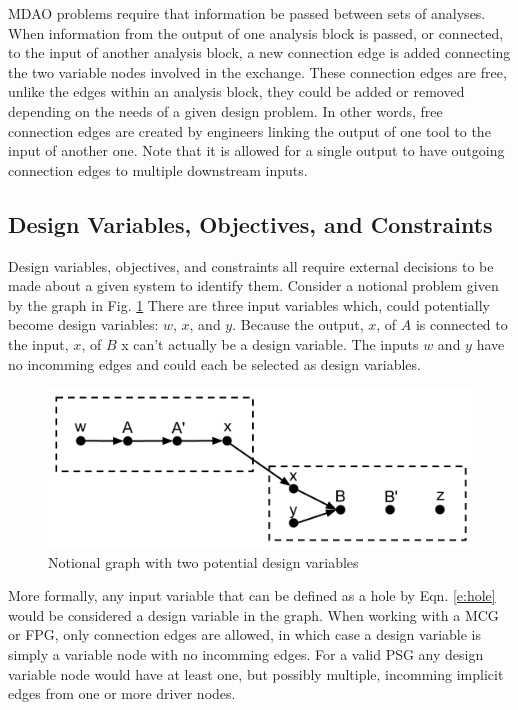 MDAO problems require that information be passed between sets of analyses. When 
information from the output of one analysis block is passed, or connected, to the 
input of another analysis block, a new connection edge is added connecting the two 
variable nodes involved in the exchange. These connection edges are free, unlike the edges 
within an analysis block, they could be added or removed depending on the needs
of a given design problem. In other words, free connection edges are created by 
engineers linking the output of one tool to the input of another one. Note that 
it is allowed for a single output to have outgoing connection edges to multiple 
downstream inputs. 

\subsection{Design Variables, Objectives, and Constraints}

Design variables, objectives, and constraints all require external decisions 
to be made about a given system to identify them. Consider a notional problem 
given by the graph in Fig. \ref{f:designvars} There are three input variables 
which, could potentially become design variables: $w$, $x$, and $y$. Because the 
output, $x$, of $A$ is connected to the input, $x$, of $B$ x can't actually be a 
design variable. The inputs $w$ and $y$ have no incomming edges and could each 
be selected as design variables. 

\begin{figure}[htb!]
  \begin{center}
    \includegraphics[width=.6\textwidth]{images/design_vars_graph}
  \end{center}
  \caption{Notional graph with two potential design variables \label{f:designvars}}
\end{figure}

More formally, any input variable that can be defined as a hole by Eqn. \ref{e:hole}
would be considered a design variable in the graph. When working with a MCG or 
FPG, only connection edges are allowed, in which case a design variable 
is simply a variable node with no incomming edges. For a valid PSG 
any design variable node would have at least one, but possibly multiple, incomming 
implicit edges from one or more driver nodes. 

